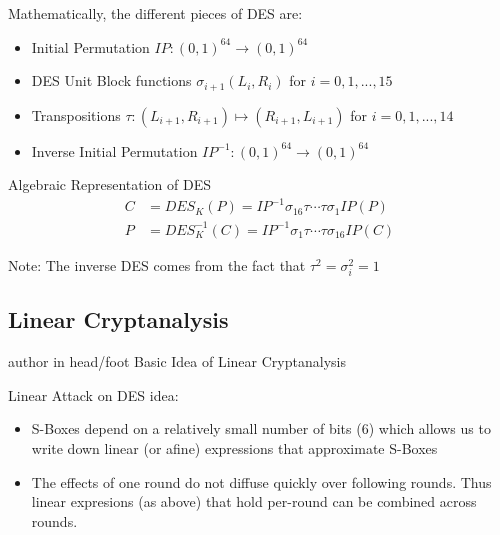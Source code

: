 \documentclass[9pt]{beamer}
\begin{document}
\begin{frame}
Mathematically, the different pieces of DES are:
\begin{itemize}
\item{Initial Permutation $IP : (0,1)^{64} \rightarrow (0,1)^{64}$}
\item{DES Unit Block functions $\sigma_{i+1} (L_i,R_i)$ for $i = 0,1,...,15$}
\item{Transpositions $\tau : (L_{i+1},R_{i+1}) \mapsto (R_{i+1},L_{i+1})$ for $i = 0,1,...,14$}
\item{Inverse Initial Permutation $IP^{-1} : (0,1)^{64} \rightarrow (0,1)^{64}$}
\end{itemize}

\begin{block}{Algebraic Representation of DES}
\begin{align*}
C &= DES_K (P) = IP^{-1} \sigma_{16} \tau \cdots \tau \sigma_1 IP (P) \\
P &= DES^{-1}_K (C) = IP^{-1} \sigma_{1} \tau \cdots \tau \sigma_{16} IP (C)
\end{align*}
\end{block}

Note: The inverse DES comes from the fact that $\tau^2 = \sigma_i^2 = 1$
\end{frame}

\subsection{Linear Cryptanalysis}
\begin{frame}
\begin{beamercolorbox}[ht=2.5ex,dp=1.125ex,center,rounded=true,shadow=true]{author in head/foot}
Basic Idea of Linear Cryptanalysis
\end{beamercolorbox}
\end{frame}

\begin{frame}
Linear Attack on DES idea:\\
\begin{itemize}
\item S-Boxes depend on a relatively small number of bits (6) which allows us to write down linear (or afine) expressions that approximate S-Boxes \\
\item The effects of one round do not diffuse quickly over following rounds. Thus linear expresions (as above) that hold per-round can be combined across rounds.
\end{itemize}
\end{frame}
\end{document}
